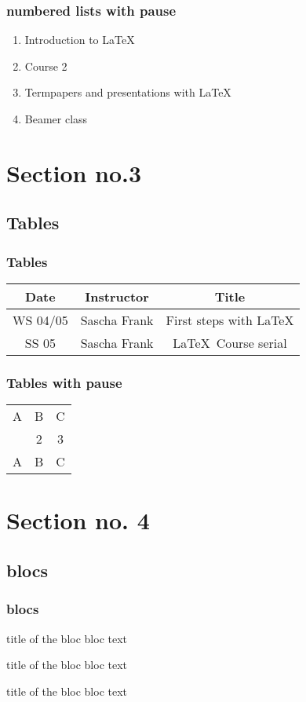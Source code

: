 \documentclass{beamer}
\begin{document}
\begin{frame}\frametitle{numbered lists with pause}
\begin{enumerate}
\item Introduction to  \LaTeX \pause 
\item Course 2 \pause 
\item Termpapers and presentations with \LaTeX \pause 
\item Beamer class
\end{enumerate}
\end{frame}

\section{Section no.3} 
\subsection{Tables}
\begin{frame}\frametitle{Tables}
\begin{tabular}{|c|c|c|}
\hline
\textbf{Date} & \textbf{Instructor} & \textbf{Title} \\
\hline
WS 04/05 & Sascha Frank & First steps with  \LaTeX  \\
\hline
SS 05 & Sascha Frank & \LaTeX \ Course serial \\
\hline
\end{tabular}
\end{frame}


\begin{frame}\frametitle{Tables with pause}
\begin{tabular}{c c c}
A & B & C \\ 
\pause 
1 & 2 & 3 \\  
\pause 
A & B & C \\ 
\end{tabular} 
\end{frame}


\section{Section no. 4}
\subsection{blocs}
\begin{frame}\frametitle{blocs}

\begin{block}{title of the bloc}
bloc text
\end{block}

\begin{exampleblock}{title of the bloc}
bloc text
\end{exampleblock}


\begin{alertblock}{title of the bloc}
bloc text
\end{alertblock}
\end{frame}
\end{document}
